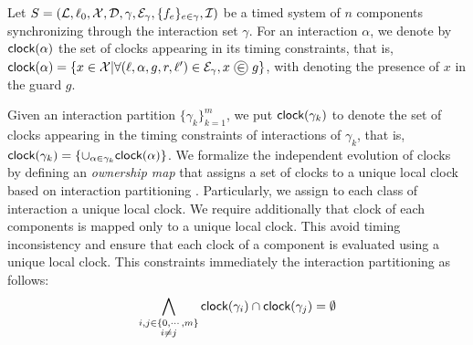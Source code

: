 Let $S=(\mathcal{L},\ell_0,\mathcal{X},\mathcal{D},\gamma,\mathcal{E}_{\gamma},\{f_e\}_{e\in\gamma},\mathcal{I})$ be a timed system of $n$ 
components synchronizing through the interaction set $\gamma$. 
For an interaction $\alpha$, we denote by $\textsf{clock}(\alpha)$ the set of clocks appearing in its
timing constraints, that is, $\clock{\alpha}=\{x\in\X|\forall (\loc,\alpha,g,r,\loc')\in
\E_{\gamma}, x \ \circlled{$\in$} \ g \}$, with \circlled{$\in$} denoting the presence of
$x$ in the guard $g$.

Given an interaction partition $\{\gamma_k\}_{k=1}^m$, we put $\textsf{clock}(\gamma_k)$ to denote
the set of clocks appearing in the timing constraints of interactions of $\gamma_k$, that is,
$\textsf{clock}(\gamma_k)=\{\cup_{\alpha\in\gamma_k}\textsf{clock}(\alpha)\}$.
We formalize the independent evolution of clocks by defining an \emph{ownership map} that assigns
a set of clocks to a unique local clock based on interaction partitioning . 
Particularly, we assign to each class of interaction a unique local clock. 
We require additionally that clock of each components is mapped only to a unique local clock.
This avoid timing inconsistency and ensure that each clock of a component is evaluated using 
a unique local 
clock. This constraints immediately the interaction partitioning as follows:
\begin{equation}\label{eq:tcf}
  \bigwedge_{\substack{i,j\in\{0,\cdots,m\}\\i\neq j}}\textsf{clock}(\gamma_i)\cap\textsf{clock}(\gamma_j)=
  \emptyset
\end{equation}

